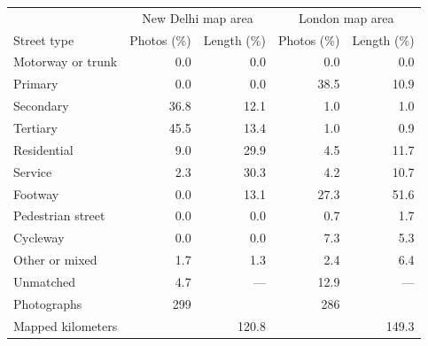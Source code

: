 \begin{tabular}{@{}lrrrr@{}}
\toprule
 & \multicolumn{2}{c}{New Delhi map area} & \multicolumn{2}{c}{London map area} \\
Street type & Photos (\%) & Length (\%) & Photos (\%) & Length (\%) \\
\midrule
Motorway or trunk & 0.0 & 0.0 & 0.0 & 0.0 \\
Primary & 0.0 & 0.0 & 38.5 & 10.9 \\
Secondary & 36.8 & 12.1 & 1.0 & 1.0 \\
Tertiary & 45.5 & 13.4 & 1.0 & 0.9 \\
Residential & 9.0 & 29.9 & 4.5 & 11.7 \\
Service & 2.3 & 30.3 & 4.2 & 10.7 \\
Footway & 0.0 & 13.1 & 27.3 & 51.6 \\
Pedestrian street & 0.0 & 0.0 & 0.7 & 1.7 \\
Cycleway & 0.0 & 0.0 & 7.3 & 5.3 \\
Other or mixed & 1.7 & 1.3 & 2.4 & 6.4 \\
Unmatched & 4.7 & — & 12.9 & — \\
Photographs & 299 &  & 286 &  \\
Mapped kilometers &  & 120.8 &  & 149.3 \\
\bottomrule
\end{tabular}
